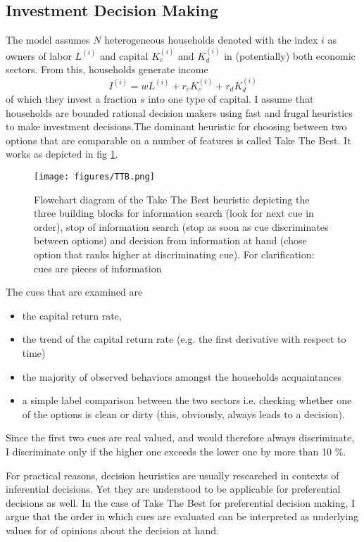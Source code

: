 \subsection{Investment Decision Making}

The model assumes $N$ heterogeneous households denoted with the index $i$ as owners of labor $L^{(i)}$ and capital $K_c^{(i)}$ and $K_d^{(i)}$ in (potentially) both economic sectors.
From this, households generate income
\begin{equation}
	I^{(i)} = w L^{(i)} + r_c K_c^{(i)} + r_d K_d^{(i)}
	\label{household_income}
\end{equation}
of which they invest a fraction $s$ into one type of capital. I assume that households are bounded rational decision makers using fast and frugal heuristics to make investment decisions.The dominant heuristic for choosing between two options that are comparable on a number of features is called Take The Best. It works as depicted in fig \ref{fig:take_the_best}.

\begin{figure}[h]
	\centering
	\texttt{[image: figures/TTB.png]}
	\caption{Flowchart diagram of the Take The Best heuristic depicting the three building blocks for information search (look for next cue in order), stop of information search (stop as soon as cue discriminates between options) and decision from information at hand (chose option that ranks higher at discriminating cue). For clarification: cues are pieces of information}
	\label{fig:take_the_best}
\end{figure}
The cues that are examined are
\begin{itemize}
	\item the capital return rate, 
	\item the trend of the capital return rate (e.g. the first derivative with respect to time)
	\item the majority of observed behaviors amongst the households acquaintances
	\item a simple label comparison between the two sectors i.e. checking whether one of the options is clean or dirty (this, obviously, always leads to a decision).
\end{itemize}
Since the first two cues are real valued, and would therefore always discriminate, I discriminate only if the higher one exceeds the lower one by more than 10 \%.

For practical reasons, decision heuristics are usually researched in contexts of inferential decisions. Yet they are understood to be applicable for preferential decisions as well. In the case of Take The Best for preferential decision making, I argue that the order in which cues are evaluated can be interpreted as underlying values for of opinions about the decision at hand.

